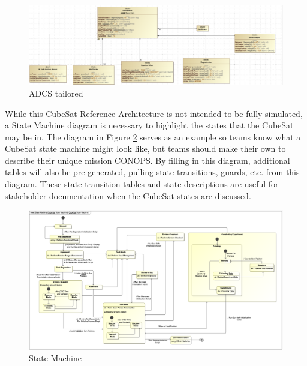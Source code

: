 \begin{figure}[H]
    \centering
    \includegraphics[width=\textwidth]{Thesis/Analysis_and_Results/Analysis and Results Figures/ADCS filled out.png}
    \caption{ADCS tailored}
    \label{fig:ADCS tailored}
\end{figure}

While this CubeSat Reference Architecture is not intended to be fully simulated, a State Machine diagram is necessary to highlight the states that the CubeSat may be in. The diagram in Figure \ref{fig:State Machine} serves as an example so teams know what a CubeSat state machine might look like, but teams should make their own to describe their unique mission CONOPS. By filling in this diagram, additional tables will also be pre-generated, pulling state transitions, guards, etc. from this diagram. These state transition tables and state descriptions are useful for stakeholder documentation when the CubeSat states are discussed.

\begin{figure}[H]
    \centering
    \includegraphics[width=\textwidth]{Thesis/Analysis_and_Results/Analysis and Results Figures/State Machine.png}
    \caption{State Machine}
    \label{fig:State Machine}
\end{figure}



